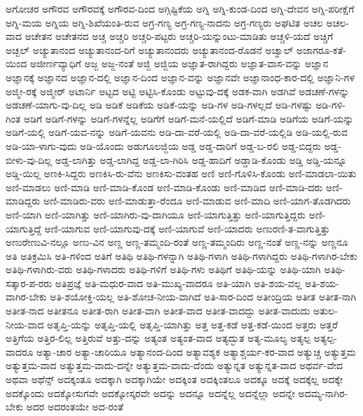 {ಅಗೋಚರ
ಅಗೌರವ
ಅಗೌರವಕ್ಕೆ
ಅಗೌರವ-ದಿಂದ
ಅಗ್ಗಿಷ್ಟಿಕೆಯ
ಅಗ್ನಿ
ಅಗ್ನಿ-ಕುಂಡ-ದಿಂದ
ಅಗ್ನಿ-ದೇವನ
ಅಗ್ನಿ-ಪರೀಕ್ಷೆಗೆ
ಅಗ್ನಿ-ಮಯ
ಅಗ್ನಿಯ
ಅಗ್ನಿ-ಶಿಖೆಯಂತಿ-ರುವ
ಅಗ್ರ-ಗಣ್ಯ
ಅಗ್ರ-ಗಣ್ಯ-ನಾದನು
ಅಗ್ರ-ಗಣ್ಯರು
ಅಘಟಿತ
ಅಚಲ
ಅಚಲ-ವಾದ
ಅಚೇತನ
ಅಚೇತನದ
ಅಚ್ಚ
ಅಚ್ಚರಿ
ಅಚ್ಚರಿ-ಪಟ್ಟರು
ಅಚ್ಚರಿ-ಯನ್ನುಂಟು-ಮಾಡಿತು
ಅಚ್ಚಳಿ-ಯದೆ
ಅಚ್ಚಿಗೆ
ಅಚ್ಬಲ್
ಅಚ್ಯುತಾನಂದ
ಅಚ್ಯುತಾನಂದ-ರಿಗೆ
ಅಚ್ಯುತಾನಂದರು
ಅಚ್ಯುತಾನಂದ-ರೊಡನೆ
ಅಚ್ವಾಲ್
ಅಜಾಗರೂ-ಕತೆ-ಯಿಂದ
ಅಜೀರ್ಣವ್ಯಾಧಿಗೆ
ಅಜ್ಜ
ಅಜ್ಜ-ನಂತೆ
ಅಜ್ಜಿ
ಅಜ್ಜಿಯ
ಅಜ್ಞಾತ-ರಾಗಿದ್ದರು
ಅಜ್ಞಾತ-ವಾಸ-ವನ್ನು
ಅಜ್ಞಾನ
ಅಜ್ಞಾನಕ್ಕೆ
ಅಜ್ಞಾನದ
ಅಜ್ಞಾನ-ದಲ್ಲಿ
ಅಜ್ಞಾನ-ದಿಂದ
ಅಜ್ಞಾನ-ವನ್ನು
ಅಜ್ಞಾನವೇ
ಅಜ್ಞಾನಾಂಧ-ಕಾರ-ದಲ್ಲಿ
ಅಜ್ಞಾನಿ-ಗಳ
ಅಜ್ಮೀ-ರಕ್ಕೆ
ಅಜ್ಮೀರ್
ಅಟಾರ್ನಿ
ಅಟ್ಟದ
ಅಟ್ಟಿ
ಅಟ್ಟಿಸಿ-ಕೊಂಡು
ಅಟ್ಟುವು-ದಕ್ಕೆ
ಅಡಕ-ವಾಗಿ
ಅಡಗಿವೆ
ಅಡಚಣೆ-ಗಳನ್ನು
ಅಡಚಣೆ-ಯಾಗು-ವು-ದಿಲ್ಲ
ಅಡಿ
ಅಡಿಕೆ
ಅಡಿಕೆಯ
ಅಡಿಕೆ-ಯನ್ನು
ಅಡಿ-ಗಳ
ಅಡಿ-ಗಳಲ್ಲದೆ
ಅಡಿ-ಗಳಷ್ಟು
ಅಡಿ-ಗಳಿ-ಗಿಂತ
ಅಡಿಗೆ
ಅಡಿಗೆ-ಗಳನ್ನು
ಅಡಿಗೆ-ಗಳನ್ನೆಲ್ಲ
ಅಡಿಗೆಗೆ
ಅಡಿಗೆ-ಮನೆ-ಯಲ್ಲಿದೆ
ಅಡಿಗೆ-ಮಾಡಿ
ಅಡಿಗೆಯ
ಅಡಿಗೆ-ಯನ್ನು
ಅಡಿಗೆ-ಯಲ್ಲಿ
ಅಡಿಗೆ-ಯವ-ನನ್ನು
ಅಡಿಗೆ-ಯವನು
ಅಡಿ-ದಾ-ವರೆ-ಯಲ್ಲಿ
ಅಡಿ-ದಾ-ವರೆ-ಯಲ್ಲಿಡಿ
ಅಡಿ-ಯಲ್ಲಿ-ರುವ
ಅಡಿ-ಯಾ-ಳಾಗು-ವುದು
ಅಡಿ-ಯೊಂದು
ಅಡುಗೂಲಜ್ಜಿಯ
ಅಡ್ಡ
ಅಡ್ಡ-ದಾರಿಗೆ
ಅಡ್ಡ-ಬ-ರಲಿ
ಅಡ್ಡ-ಬಿದ್ದರು
ಅಡ್ಡ-ಬೀಳು-ವು-ದಿಲ್ಲ
ಅಡ್ಡ-ಲಾಗಿತ್ತು
ಅಡ್ಡ-ಲಾಗಿದ್ದ
ಅಡ್ಡ-ಲಾ-ಗಿರಿಸಿ
ಅಡ್ಡ-ಹಾದಿಗೆ
ಅಡ್ಡಾಡಿ-ಕೊಂಡು
ಅಡ್ಡಿ
ಅಡ್ಡಿ-ಯನ್ನೂ
ಅಡ್ಡಿ-ಯಿಲ್ಲ
ಅಣಕಿ-ಸಿದ್ದರು
ಅಣಕಿಸಿ-ರು-ವೆನು
ಅಣಕಿಸು-ವಂತಹ
ಅಣಿ
ಅಣಿ-ಗೊಳಿಸಿ-ಕೊಂಡು
ಅಣಿ-ಮಾಡಲಾ-ಯಿತು
ಅಣಿ-ಮಾಡಲು
ಅಣಿ-ಮಾಡಿ
ಅಣಿ-ಮಾಡಿ-ಕೊಂಡ
ಅಣಿ-ಮಾಡಿ-ಕೊಂಡು
ಅಣಿ-ಮಾಡಿದ
ಅಣಿ-ಮಾಡಿ-ದರು
ಅಣಿ-ಮಾಡಿದ್ದರು
ಅಣಿ-ಮಾಡಿರು-ವರು
ಅಣಿ-ಮಾಡುತ್ತಾ-ರೆಂದೂ
ಅಣಿ-ಮಾಡುವ
ಅಣಿ-ಮಾದಿ
ಅಣಿ-ಯಾಗ-ತೊಡಗಿದರು
ಅಣಿ-ಯಾಗಿ
ಅಣಿ-ಯಾಗಿತ್ತು
ಅಣಿ-ಯಾಗಿರು-ವು-ದಾಗಿಯೂ
ಅಣಿ-ಯಾಗುತ್ತಿತ್ತು
ಅಣಿ-ಯಾಗುತ್ತಿದ್ದರು
ಅಣಿ-ಯಾಗುತ್ತಿದ್ದೆ
ಅಣಿ-ಯಾಗುವ
ಅಣಿ-ಯಾಗುವು-ದಕ್ಕೆ
ಅಣಿ-ಯಾಗುವೆ
ಅಣಿ-ಯಾದರು
ಅಣುರಣಿ-ತ-ವಾಗುತ್ತಿತ್ತು
ಅಣುರೇಣುವಿ-ನಲ್ಲೂ
ಅಣು-ವಿನ
ಅಣ್ಣ
ಅಣ್ಣ-ತಮ್ಮಂದಿ-ರಂತೆ
ಅಣ್ಣ-ತಮ್ಮಂದಿರು
ಅಣ್ಣ-ನಂತೆ
ಅಣ್ಣ-ನನ್ನು
ಅಣ್ಣನೂ
ಅತಿ
ಅತಿಕ್ರಮಿಸಿ
ಅತಿ-ಗಳಿಂದ
ಅತಿಗೆ
ಅತಿಥಿ
ಅತಿಥಿ-ಗಳನ್ನಾಗಿ
ಅತಿಥಿ-ಗಳಾಗಿ
ಅತಿಥಿ-ಗಳಾಗಿದ್ದರು
ಅತಿಥಿ-ಗಳಾಗಿರ-ಬೇಕು
ಅತಿಥಿ-ಗಳಾಗಿರು-ವರು
ಅತಿಥಿ-ಗಳಾದರು
ಅತಿಥಿ-ಗಳಿಗೆ
ಅತಿಥಿ-ಗಳು
ಅತಿಥಿಗೆ
ಅತಿಥಿ-ಯನ್ನು
ಅತಿಥಿ-ಯಾಗಿ
ಅತಿಥಿ-ಸತ್ಕಾರ-ಪ-ರರು
ಅತಿಪ್ರಜ್ಞೆ
ಅತಿ-ಮಧುರ-ವಾದ
ಅತಿ-ಮುಖ್ಯ-ವಾದರೂ
ಅತಿ-ಯಾಗಿ
ಅತಿ-ಶಯ-ವಲ್ಲ
ಅತಿ-ಶಯ-ವಾಗಿರ-ಬೇಕು
ಅತಿ-ಶಯೋಕ್ತಿ-ಯಲ್ಲ
ಅತಿ-ಶೋಚ-ನೀಯ-ವಾಗಿದೆ
ಅತಿ-ಸಾರ-ದಿಂದ
ಅತೀಂದ್ರಿಯ
ಅತೀತ
ಅತೀತ-ನಾಗಿ
ಅತೀತ-ನಾದ
ಅತೀತನೂ
ಅತೀತ-ರಾಗಿ
ಅತೀತ-ವಾಗಿ
ಅತೀತ-ವಾದ
ಅತೀತ-ವಾದದ್ದು
ಅತೀತ-ವಾದುದು
ಅತುಲ-ನೀಯ-ವಾದ
ಅತೃಪ್ತಿ-ಯನ್ನು
ಅತೃಪ್ತಿ-ಯಲ್ಲಿ
ಅತೃಪ್ತಿ-ಯಾಗಿತ್ತು
ಅತ್ತ
ಅತ್ತ-ಕಡೆ
ಅತ್ತ-ಕಡೆ-ಯಿಂದ
ಅತ್ತರು
ಅತ್ತರೆ
ಅತ್ತಿಗೆಯ
ಅತ್ತಿರ-ಲಿಲ್ಲ
ಅತ್ತಿರುವೆ
ಅತ್ತು-ದನ್ನು
ಅತ್ಯಂತ
ಅತ್ಯಂತ-ವಾದ
ಅತ್ಯದ್ಭುತ
ಅತ್ಯ-ಮೂಲ್ಯ
ಅತ್ಯಲ್ಪ
ಅತ್ಯಲ್ಪ-ವಾದರೂ
ಅತ್ಯಾ-ಚಾರ
ಅತ್ಯಾ-ಚಾರಿಯೂ
ಅತ್ಯಾನಂದ-ದಿಂದ
ಅತ್ಯಾವಶ್ಯಕ
ಅತ್ಯಾಶ್ಚರ್ಯ-ಕರ-ವಾದ
ಅತ್ಯುಚ್ಚ
ಅತ್ಯುತ್ತಮ
ಅತ್ಯುತ್ತಮ-ವಾದ
ಅತ್ಯುತ್ತಮ-ವಾದು-ದನ್ನೇ
ಅತ್ಯುತ್ತಮ-ವಾದು-ದೆಂದು
ಅತ್ಯುನ್ನತ
ಅತ್ಯುನ್ನತ-ವಾದ
ಅಥರ್ವ-ವೇದ
ಅಥವಾ
ಅಥೆನ್ಸ್
ಅದಕ್ಕಂತೂ
ಅದಕ್ಕಾಗಿ
ಅದಕ್ಕಾಗಿಯೇ
ಅದಕ್ಕಿಂತ
ಅದಕ್ಕಿಂತಲೂ
ಅದಕ್ಕೂ
ಅದಕ್ಕೆ
ಅದಕ್ಕೆಲ್ಲ
ಅದಕ್ಕೇ
ಅದಕ್ಕೊಂದು
ಅದಕ್ಕೋಸುಗವೇ
ಅದಕ್ಕೋಸ್ಕರವೇ
ಅದನ್ನು
ಅದನ್ನೂ
ಅದನ್ನೆಲ್ಲ
ಅದನ್ನೆಲ್ಲಾ
ಅದನ್ನೇ
ಅದಮ್ಯ-ನಾಗಿರ-ಬೇಕು
ಅದರ
ಅದರಂತಯೇ
ಅದ-ರಂತೆ
}
